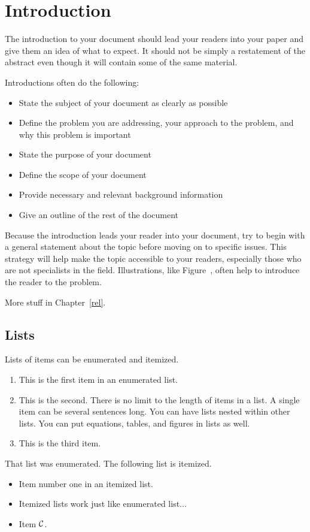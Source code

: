 \cleardoublepage
\chapter{Introduction}
\label{intro} The introduction to your document should lead your
readers into your paper and give them an idea of what to expect. It
should not be simply a restatement of the abstract even though it
will contain some of the same material.

Introductions often do the following:
\begin{itemize}
  \item State the subject of your document as clearly as possible

  \item Define the problem you are addressing, your approach to the problem, and why this problem is important
  \item State the purpose of your document
  \item Define the scope of your document
  \item Provide necessary and relevant background information
  \item Give an outline of the rest of the document
\end{itemize}


Because the introduction leads your reader into your document, try
to begin with a general statement about the topic before moving on
to specific issues. This strategy will help make the topic
accessible to your readers, especially those who are not specialists
in the field. Illustrations, like Figure~, often
help to introduce the reader to the problem.

More stuff in Chapter~\ref{rel}.

\section{ Lists } Lists of items can be enumerated and itemized.

\begin{enumerate}
\item This is the first item in an enumerated list.
\item   This is the second.  There is no limit to the length of items in a list.
    A single item can be several sentences long.  You can have lists nested
    within other lists.  You can put equations, tables, and figures in
    lists as well.
\item   This is the third item.
\end{enumerate}
That list was enumerated.  The following list is itemized.
\begin{itemize}
\item   Item number one in an itemized list.
\item   Itemized lists work just like enumerated list...
\item   Item $\cal C$.
\end{itemize}
